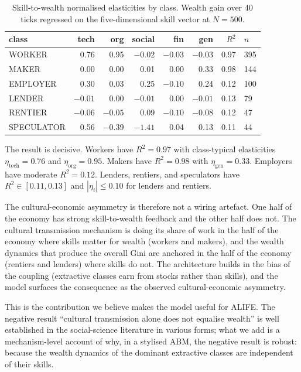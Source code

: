 \documentclass[11pt]{article}
\begin{document}
\begin{table}[t]
\centering
\small
\caption{Skill-to-wealth normalised elasticities by class. Wealth gain
over 40 ticks regressed on the five-dimensional skill vector at
$N=500$.}
\label{tab:elasticity}
\begin{tabular}{lrrrrrrl}
\toprule
class & tech & org & social & fin & gen & $R^2$ & $n$ \\
\midrule
WORKER     & 0.76 & 0.95 & $-0.02$ & $-0.03$ & $-0.03$ & 0.97 & 395 \\
MAKER      & 0.00 & 0.00 & 0.01 & 0.00 & 0.33 & 0.98 & 144 \\
EMPLOYER   & 0.30 & 0.03 & 0.25 & $-0.10$ & 0.24 & 0.12 & 100 \\
LENDER     & $-0.01$ & 0.00 & $-0.01$ & 0.00 & $-0.01$ & 0.13 & 79 \\
RENTIER    & $-0.06$ & $-0.05$ & 0.09 & $-0.10$ & $-0.08$ & 0.12 & 47 \\
SPECULATOR & 0.56 & $-0.39$ & $-1.41$ & 0.04 & 0.13 & 0.11 & 44 \\
\bottomrule
\end{tabular}
\end{table}

The result is decisive. Workers have $R^2 = 0.97$ with
class-typical elasticities $\eta_\text{tech} = 0.76$ and
$\eta_\text{org} = 0.95$. Makers have $R^2 = 0.98$ with
$\eta_\text{gen} = 0.33$. Employers have moderate $R^2 = 0.12$.
Lenders, rentiers, and speculators have $R^2 \in [0.11, 0.13]$ and
$|\eta_i| \leq 0.10$ for lenders and rentiers.

The cultural-economic asymmetry is therefore not a wiring artefact.
One half of the economy has strong skill-to-wealth feedback and the
other half does not. The cultural transmission mechanism is doing
its share of work in the half of the economy where skills matter for
wealth (workers and makers), and the wealth dynamics that produce the
overall Gini are anchored in the half of the economy (rentiers and
lenders) where skills do not. The architecture builds in the bias of
the coupling (extractive classes earn from stocks rather than
skills), and the model surfaces the consequence as the observed
cultural-economic asymmetry.

This is the contribution we believe makes the model useful for
ALIFE. The negative result ``cultural transmission alone does not
equalise wealth'' is well established in the social-science
literature in various forms; what we add is a mechanism-level
account of why, in a stylised ABM, the negative result is robust:
because the wealth dynamics of the dominant extractive classes are
independent of their skills.
\end{document}

